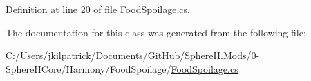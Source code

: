 Definition at line 20 of file Food\+Spoilage.\+cs.



The documentation for this class was generated from the following file\+:\begin{DoxyCompactItemize}
\item 
C\+:/\+Users/jkilpatrick/\+Documents/\+Git\+Hub/\+Sphere\+I\+I.\+Mods/0-\/\+Sphere\+I\+I\+Core/\+Harmony/\+Food\+Spoilage/\mbox{\hyperlink{_food_spoilage_8cs}{Food\+Spoilage.\+cs}}\end{DoxyCompactItemize}
